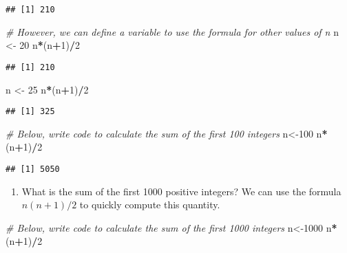 \documentclass[]{article}
\newenvironment{Shaded}{\begin{snugshade}}{\end{snugshade}}
\newcommand{\CommentTok}[1]{\textcolor[rgb]{0.56,0.35,0.01}{\textit{#1}}}
\newcommand{\DecValTok}[1]{\textcolor[rgb]{0.00,0.00,0.81}{#1}}
\newcommand{\NormalTok}[1]{#1}
\newcommand{\OperatorTok}[1]{\textcolor[rgb]{0.81,0.36,0.00}{\textbf{#1}}}
\newcommand{\StringTok}[1]{\textcolor[rgb]{0.31,0.60,0.02}{#1}}
\providecommand{\tightlist}{%
  \setlength{\itemsep}{0pt}\setlength{\parskip}{0pt}}
\begin{document}
\begin{verbatim}
## [1] 210
\end{verbatim}

\begin{Shaded}
\begin{Highlighting}[]
\CommentTok{# However, we can define a variable to use the formula for other values of n}
\NormalTok{n <-}\StringTok{ }\DecValTok{20}
\NormalTok{n}\OperatorTok{*}\NormalTok{(n}\OperatorTok{+}\DecValTok{1}\NormalTok{)}\OperatorTok{/}\DecValTok{2}
\end{Highlighting}
\end{Shaded}

\begin{verbatim}
## [1] 210
\end{verbatim}

\begin{Shaded}
\begin{Highlighting}[]
\NormalTok{n <-}\StringTok{ }\DecValTok{25}
\NormalTok{n}\OperatorTok{*}\NormalTok{(n}\OperatorTok{+}\DecValTok{1}\NormalTok{)}\OperatorTok{/}\DecValTok{2}
\end{Highlighting}
\end{Shaded}

\begin{verbatim}
## [1] 325
\end{verbatim}

\begin{Shaded}
\begin{Highlighting}[]
\CommentTok{# Below, write code to calculate the sum of the first 100 integers}
\NormalTok{n<-}\DecValTok{100}
\NormalTok{n}\OperatorTok{*}\NormalTok{(n}\OperatorTok{+}\DecValTok{1}\NormalTok{)}\OperatorTok{/}\DecValTok{2}
\end{Highlighting}
\end{Shaded}

\begin{verbatim}
## [1] 5050
\end{verbatim}

\begin{enumerate}
\def\labelenumi{\arabic{enumi}.}
\setcounter{enumi}{1}
\tightlist
\item
  What is the sum of the first 1000 positive integers? We can use the
  formula \(n(n+1)/2\) to quickly compute this quantity.
\end{enumerate}

\begin{Shaded}
\begin{Highlighting}[]
\CommentTok{# Below, write code to calculate the sum of the first 1000 integers }
\NormalTok{n<-}\DecValTok{1000}
\NormalTok{n}\OperatorTok{*}\NormalTok{(n}\OperatorTok{+}\DecValTok{1}\NormalTok{)}\OperatorTok{/}\DecValTok{2}
\end{Highlighting}
\end{Shaded}
\end{document}
